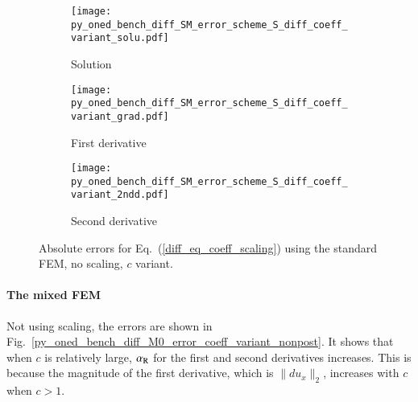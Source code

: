 \documentclass[review,3p]{elsarticle}
\begin{document}
\begin{figure}[!ht]
    \begin{subfigure}{5.5cm}
        \texttt{[image: py\_oned\_bench\_diff\_SM\_error\_scheme\_S\_diff\_coeff\_variant\_solu.pdf]}
        \caption{Solution}
        \label{py_oned_bench_diff_SM_error_scheme_S_diff_coeff_variant_solu}
    \end{subfigure}
    \hspace{-0.2cm}
    \begin{subfigure}{5.5cm}
        \texttt{[image: py\_oned\_bench\_diff\_SM\_error\_scheme\_S\_diff\_coeff\_variant\_grad.pdf]}
        \caption{First derivative}
        \label{py_oned_bench_diff_SM_error_scheme_S_diff_coeff_variant_grad}
    \end{subfigure}
    \hspace{-0.2cm}
    \begin{subfigure}{5.5cm}
        \texttt{[image: py\_oned\_bench\_diff\_SM\_error\_scheme\_S\_diff\_coeff\_variant\_2ndd.pdf]}
        \caption{Second derivative}
        \label{py_oned_bench_diff_SM_error_scheme_S_diff_coeff_variant_2ndd}
    \end{subfigure}
\caption{Absolute errors for Eq.~(\ref{diff_eq_coeff_scaling}) using the standard FEM, no scaling, $c$ variant.}
\label{py_oned_bench_diff_SM_error_scheme_S_diff_coeff_variant}
\end{figure}

\newpage
\paragraph{The mixed FEM}
Not using scaling, the errors are shown in Fig.~\ref{py_oned_bench_diff_M0_error_coeff_variant_nonpost}.
It shows that when $c$ is relatively large, $\alpha_{\rm R}$ for the first and second derivatives increases. This is because the magnitude of the first derivative, which is $\|du_x\|_2$, increases with $c$ when $c>1$.
\end{document}

